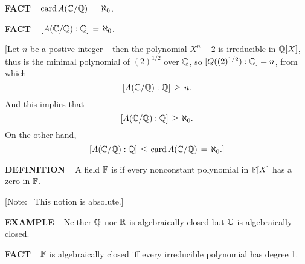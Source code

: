 \vspace{0.1cm}


\begin{x}{\small\bf FACT} \ %
$\text{card}\hspace{0.05cm} A(\mathbb{C}/\mathbb{Q}) \hspace{0.05cm} = \hspace{0.05cm} \aleph_0$.
\end{x}

\vspace{0.1cm}

\begin{x}{\small\bf FACT} \ %
$[A(\mathbb{C}/\mathbb{Q}):\mathbb{Q}] \hspace{0.05cm} = \hspace{0.05cm} \aleph_0$.

\vspace{0.1cm}

[Let $n$ be a postive integer $-$then the polynomial $X^n - 2$ is irreducible in $\mathbb{Q}[X]$, thus is the minimal polynomial of 
$(2)^{1/2}$ over $\mathbb{Q}$, so $[Q((2)^{1/2}):\mathbb{Q}] = n$, from which 
\[
[A(\mathbb{C}/\mathbb{Q}):\mathbb{Q}] \hspace{0.05cm} \geq \hspace{0.05cm} n.
\]
And this implies that 
\[
[A(\mathbb{C}/\mathbb{Q}):\mathbb{Q}] \hspace{0.05cm} \geq \hspace{0.05cm} \aleph_0.
\]
On the other hand, 
\[
[A(\mathbb{C}/\mathbb{Q}):\mathbb{Q}] \hspace{0.05cm} \leq \hspace{0.05cm} \text{card}\hspace{0.05cm} A(\mathbb{C}/\mathbb{Q}) \hspace{0.05cm} = \hspace{0.05cm} \aleph_0.]
\]
\end{x}

\vspace{0.1cm}

\begin{x}{\small\bf DEFINITION} \ %
A field $\mathbb{F}$ is 
if every nonconstant polynomial in $\mathbb{F}[X]$ has a zero in $\mathbb{F}$.

\vspace{0.1cm}

[Note: \ This notion is absolute.]
\end{x}

\vspace{0.1cm}



\begin{x}{\small\bf EXAMPLE} \ %
Neither $\mathbb{Q}$ nor $\mathbb{R}$ is algebraically closed but $\mathbb{C}$ is algebraically closed.
\end{x}

\vspace{0.1cm}


\begin{x}{\small\bf FACT} \ %
$\mathbb{F}$ is algebraically closed iff every irreducible polynomial has degree 1.
\end{x}

\vspace{0.1cm}


